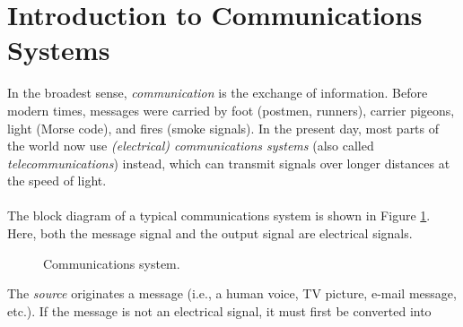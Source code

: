 \documentclass{report}
\begin{document}
\section{Introduction to Communications Systems}
In the broadest sense, \emph{communication} is the exchange of information. Before modern times, messages were carried by foot (postmen, runners), carrier pigeons, light (Morse code), and fires (smoke signals). 
In the present day, most parts of the world now use \emph{(electrical) communications systems} (also called \emph{telecommunications}) instead, which can transmit signals over longer distances at the speed of light.
\\ \\
The block diagram of a typical communications system is shown in Figure \ref{comms7}. Here, both the message signal and the output signal are electrical signals. 
\begin{figure}[!hbt]
    \caption{Communications system.}
    \label{comms7}
    \centering
\end{figure}
The \emph{source} originates a message (i.e., a human voice, TV picture, e-mail message, etc.). If the message is not an electrical signal, it must first be converted into 
\end{document}
